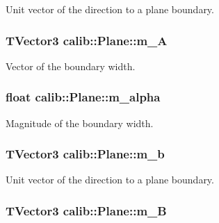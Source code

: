 Unit vector of the direction to a plane boundary. 

\hypertarget{classcalib_1_1Plane_afb72762fc0bb5e4e9a5e19f0c9f73e33}{
\subsubsection[{m\-\_\-\-A}]{\setlength{\rightskip}{0pt plus 5cm}T\-Vector3 calib\-::\-Plane\-::m\-\_\-\-A\hspace{0.3cm}{\ttfamily [private]}}}\label{classcalib_1_1Plane_afb72762fc0bb5e4e9a5e19f0c9f73e33}


Vector of the boundary width. 

\hypertarget{classcalib_1_1Plane_a6a08d6b346557d6e889c4fda0099bd43}{
\subsubsection[{m\-\_\-alpha}]{\setlength{\rightskip}{0pt plus 5cm}float calib\-::\-Plane\-::m\-\_\-alpha\hspace{0.3cm}{\ttfamily [private]}}}\label{classcalib_1_1Plane_a6a08d6b346557d6e889c4fda0099bd43}


Magnitude of the boundary width. 

\hypertarget{classcalib_1_1Plane_a848054d2fc3233d28b439d579bab9fd5}{
\subsubsection[{m\-\_\-b}]{\setlength{\rightskip}{0pt plus 5cm}T\-Vector3 calib\-::\-Plane\-::m\-\_\-b\hspace{0.3cm}{\ttfamily [private]}}}\label{classcalib_1_1Plane_a848054d2fc3233d28b439d579bab9fd5}


Unit vector of the direction to a plane boundary. 

\hypertarget{classcalib_1_1Plane_a30876b03ceb26caffaab1ebc34892b36}{
\subsubsection[{m\-\_\-\-B}]{\setlength{\rightskip}{0pt plus 5cm}T\-Vector3 calib\-::\-Plane\-::m\-\_\-\-B\hspace{0.3cm}{\ttfamily [private]}}}\label{classcalib_1_1Plane_a30876b03ceb26caffaab1ebc34892b36}


